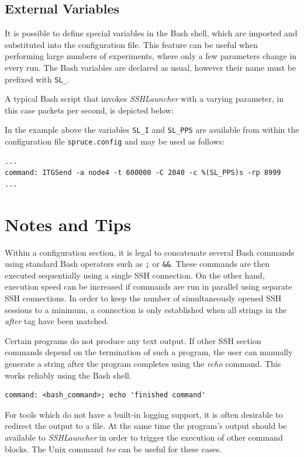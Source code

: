 \section{External Variables}

It is possible to define special variables in the Bash shell, which
are imported and substituted into the configuration file. This feature
can be useful when performing large numbers of experiments, where only
a few parameters change in every run. The Bash variables are declared
as usual, however their name must be prefixed with \Verb=SL_=.

A typical Bash script that invokes \emph{SSHLauncher} with a varying
parameter, in this case packets per second, is depicted below:


In the example above the variables \Verb=SL_I= and \Verb=SL_PPS= are
available from within the configuration file \Verb=spruce.config= and
may be used as follows:

\begin{Verbatim}
...
command: ITGSend -a node4 -t 600000 -C 2040 -c %(SL_PPS)s -rp 8999
...
\end{Verbatim}

\chapter{Notes and Tips}
Within a configuration section, it is legal to concatenate several
Bash commands using standard Bash operators such as \Verb=;= or
\Verb=&&=. These commands are then executed sequentially using a
single SSH connection. On the other hand, execution speed can be
increased if commands are run in parallel using separate SSH
connections. In order to keep the number of simultaneously opened SSH
sessions to a minimum, a connection is only established when all
strings in the \emph{after} tag have been matched.


Certain programs do not produce any text output. If other SSH section
commands depend on the termination of such a program, the user can
manually generate a string after the program completes using the
\emph{echo} command. This works reliably using the Bash shell.

\begin{Verbatim}
command: <bash_command>; echo 'finished command'
\end{Verbatim}


For tools which do not have a built-in logging support, it is often
desirable to redirect the output to a file. At the same time the
program's output should be available to \emph{SSHLauncher} in order to
trigger the execution of other command blocks. The Unix command
\emph{tee} can be useful for these cases.

